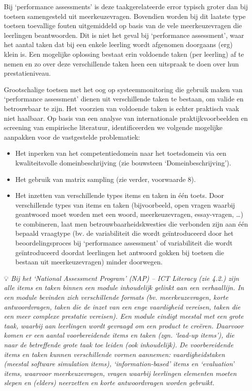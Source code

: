 \documentclass[
  letterpaper,
]{report}
\providecommand{\tightlist}{%
  \setlength{\itemsep}{0pt}\setlength{\parskip}{0pt}}
\begin{document}
Bij `performance assessments' is deze taakgerelateerde error typisch
groter dan bij toetsen samengesteld uit meerkeuzevragen. Bovendien
worden bij dit laatste type toetsen toevallige fouten uitgemiddeld op
basis van de vele meerkeuzevragen die leerlingen beantwoorden. Dit is
niet het geval bij `performance assessment', waar het aantal taken dat
bij een enkele leerling wordt afgenomen doorgaans (erg) klein is. Een
mogelijke oplossing bestaat erin voldoende taken (per leerling) af te
nemen en zo over deze verschillende taken heen een uitspraak te doen
over hun prestatieniveau.

Grootschalige toetsen met het oog op systeemmonitoring die gebruik maken
van `performance assessment' dienen uit verschillende taken te bestaan,
om valide en betrouwbaar te zijn. Het voorzien van voldoende taken is
echter praktisch vaak niet haalbaar. Op basis van een analyse van
internationale praktijkvoorbeelden en screening van empirische
literatuur, identificeerden we volgende mogelijke aanpakken voor de
vastgestelde problematiek:

\begin{itemize}
\tightlist
\item
  Het inperken van het competentiedomein naar het toetsdomein via een
  kwaliteitsvolle domeinbeschrijving (zie bouwsteen
  `Domeinbeschrijving').
\item
  Het gebruik van matrix sampling (zie verder, voorwaarde 8).
\item
  Het inzetten van verschillende types items en taken in één toets. Door
  verschillende types van items en taken (bijvoorbeeld, open vragen
  waarbij geantwoord moet worden met een woord, meerkeuzevragen,
  essay-vragen, \ldots) te combineren, laat men betrouwbaarheidskwesties
  die verbonden zijn aan één bepaald vraagtype (bv. de variabiliteit die
  wordt geïntroduceerd door het beoordelingsproces bij `performance
  assessment' of variabiliteit die wordt geïntroduceerd doordat
  leerlingen het antwoord gokken bij toetsen die bestaan uit
  meerkeuzevragen) minder doorwegen.
\end{itemize}

💡 \emph{Bij het `National Assessment Program' (NAP) -- ICT Literacy
(zie 4.2.) zijn alle items en taken binnen een module inhoudelijk
gelinkt aan een verhaallijn. In een module bevinden zich verschillende
formats (bv. meerkeuzevragen, korte antwoordvragen, taken die de inzet
van een enge vaardigheid vereisen, taken die een meer complexe prestatie
vereisen). Een module eindigt meestal met een grote taak, waarbij aan
leerlingen wordt gevraagd om een product te creëren. Daarvoor komen er
een aantal voorbereidende items en taken (zgn. `lead-up items'), die
naar de betreffende grote taak toe leiden (ook inhoudelijk). De
voorbereidende items en taken kunnen verschillende vormen aannemen:
vaardigheidstaken (meestal software simulation items),
`information-based' items en `evaluation' items, waarvoor
meerkeuzevragen, vragen waarbij leerlingen elementen moeten slepen en
(elders) neerzetten en korte antwoordvragen worden gebruikt.}
\end{document}
